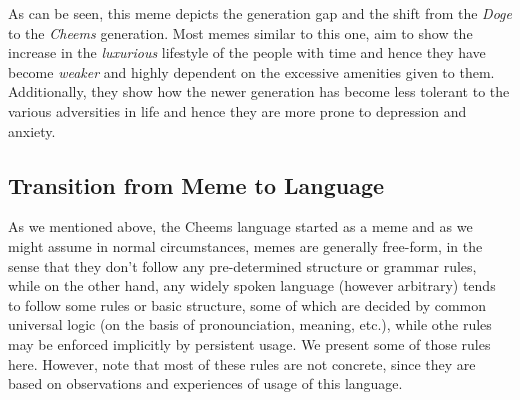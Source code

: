 \documentclass{article}
\begin{document}
As can be seen, this meme depicts the generation gap and the shift from the \textit{Doge} to the \textit{Cheems} generation. Most memes similar to this one, aim to show the increase in the \textit{luxurious} lifestyle of the people with time and hence they have become \textit{weaker} and highly dependent on the excessive amenities given to them. Additionally, they show how the newer generation has become less tolerant to the various adversities in life and hence they are more prone to depression and anxiety.

\subsection{Transition from Meme to Language}
As we mentioned above, the Cheems language started as a meme and as we might assume in normal circumstances, memes are generally free-form, in the sense that they don't follow any pre-determined structure or grammar rules, while on the other hand, any widely spoken language (however arbitrary) tends to follow some rules or basic structure, some of which are decided by common universal logic (on the basis of pronounciation, meaning, etc.), while othe rules may be enforced implicitly by persistent usage. We present some of those rules here. However, note that most of these rules are not concrete, since they are based on observations and experiences of usage of this language.
\end{document}
